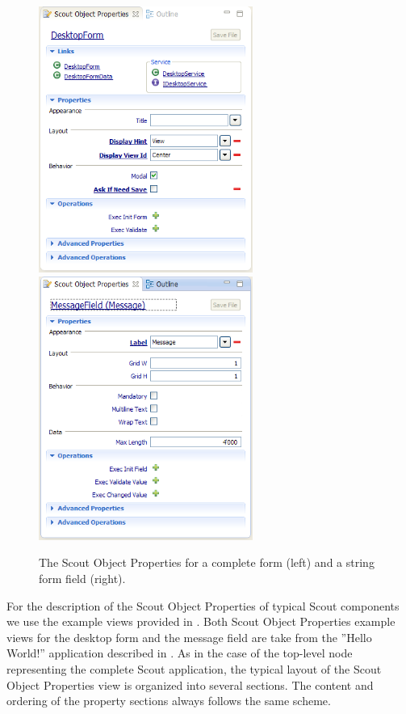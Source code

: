 \documentclass[a4paper,10pt,twoside]{book}
\begin{document}
\begin{figure}
\includegraphics[width=7cm]{properties_form.png} \hspace{5mm}
\includegraphics[width=7cm]{properties_stringfield.png}
\caption{The Scout Object Properties for a complete form (left) and a string form field (right).}
\end{figure}

For the description of the Scout Object Properties of typical Scout components we use the example views provided in . 
Both Scout Object Properties example views for the desktop form and the message field are take from the ''Hello World!'' application described in . 
As in the case of the top-level node representing the complete Scout application, the typical layout of the Scout Object Properties view is organized into several sections. 
The content and ordering of the property sections always follows the same scheme.
\end{document}

